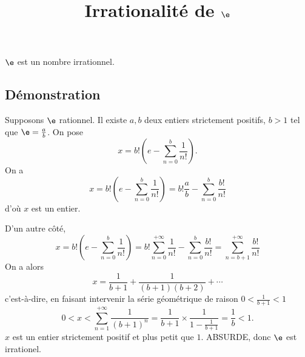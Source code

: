 \documentclass[fontsize=12pt,twoside=false,parskip=half]{scrartcl}
\title{Irrationalité de $\e$}
\date{}
\author{}
\begin{document}
\maketitle
   \begin{Theoreme}[Irrationalité de $\e$]
      $\e$ est un nombre irrationnel.
   \end{Theoreme}
   \subsection{Démonstration}
      Supposons $\e$ rationnel. Il existe $a, b$ deux entiers strictement positifs, $b > 1$ tel que  $\e = \frac{a}{b}$.
      On pose
      \[
         x = b!\left(e - \sum_{n = 0}^b \frac{1}{n!}\right).
      \]
      On a 
      \[
         x =  b!\left(e - \sum_{n = 0}^b \frac{1}{n!}\right) = b! \frac{a}{b} - \sum_{n = 0}^b \frac{b!}{n!}
      \]
      d’où $x$ est un entier.
      
      D’un autre côté,
      \[
         x = b!\left(e - \sum_{n = 0}^b \frac{1}{n!}\right) = b! \sum_{n = 0}^{+\infty} \frac{1}{n!} - \sum_{n = 0}^b \frac{b!}{n!}
                                                           = \sum_{n = b + 1}^{+\infty} \frac{b!}{n!}
      \]
      On a alors
      \[
         x = \frac{1}{b + 1} + \frac{1}{(b + 1)(b + 2)} + \cdots 
      \]
      c’est-à-dire, en faisant intervenir la série géométrique de raison $0 < \frac{1}{b + 1} < 1$ 
      \[
         0 < x < \sum_{n = 1}^{+\infty} \frac{1}{(b + 1)^n} = \frac{1}{b + 1} \times \frac{1}{1 - \frac{1}{b + 1}} = \frac{1}{b} < 1.
      \]
      $x$ est un entier strictement positif et plus petit que $1$. ABSURDE, donc $\e$ est irrationel.
\end{document}
